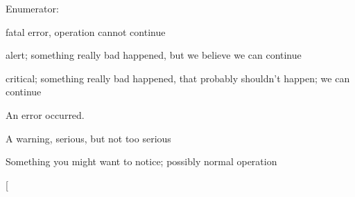 \begin{Desc}
\item[Enumerator: ]\par
\begin{description}
\item[{\em 
UPK\_\-DIAGLVL\_\-FATAL\label{group__upk__errors_gge29e017a754f6b29049ff0f27f756ef94be0088d1ce8fba7a8845163c6487523}
}]fatal error, operation cannot continue \item[{\em 
UPK\_\-DIAGLVL\_\-ALERT\label{group__upk__errors_gge29e017a754f6b29049ff0f27f756ef97b075ad066126edb26f2b58c61543e54}
}]alert; something really bad happened, but we believe we can continue \item[{\em 
UPK\_\-DIAGLVL\_\-CRIT\label{group__upk__errors_gge29e017a754f6b29049ff0f27f756ef9b81612aaca7fc7cfcb83fe9a4eb9a252}
}]critical; something really bad happened, that probably shouldn't happen; we can continue \item[{\em 
UPK\_\-DIAGLVL\_\-ERROR\label{group__upk__errors_gge29e017a754f6b29049ff0f27f756ef91459452d1435cb0078a5c2e9bd29e195}
}]An error occurred. \item[{\em 
UPK\_\-DIAGLVL\_\-WARN\label{group__upk__errors_gge29e017a754f6b29049ff0f27f756ef9ace78c6dd316904dd34f7d1b6bc64996}
}]A warning, serious, but not too serious \item[{\em 
UPK\_\-DIAGLVL\_\-NOTICE\label{group__upk__errors_gge29e017a754f6b29049ff0f27f756ef93e9b988b3546225bc6972c09d4c3b40a}
}]Something you might want to notice; possibly normal operation \item[{\em 
}
\end{description}
\end{Desc}
